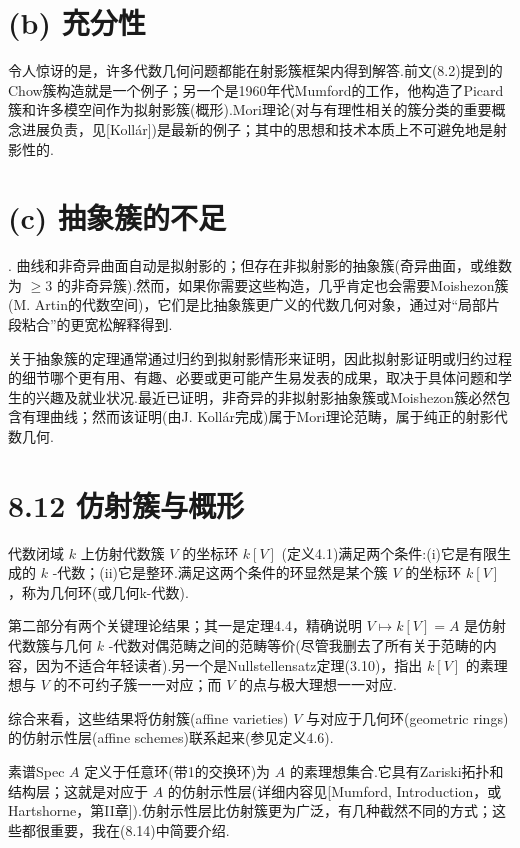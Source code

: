 \section{(b) 充分性}

令人惊讶的是，许多代数几何问题都能在射影簇框架内得到解答.前文(8.2)提到的Chow簇构造就是一个例子；另一个是1960年代Mumford的工作，他构造了Picard簇和许多模空间作为拟射影簇(概形).Mori理论(对与有理性相关的簇分类的重要概念进展负责，见[Kollár])是最新的例子；其中的思想和技术本质上不可避免地是射影性的.

\section{(c) 抽象簇的不足}
.
曲线和非奇异曲面自动是拟射影的；但存在非拟射影的抽象簇(奇异曲面，或维数为 \(\geq  3\) 的非奇异簇).然而，如果你需要这些构造，几乎肯定也会需要Moishezon簇(M. Artin的代数空间)，它们是比抽象簇更广义的代数几何对象，通过对“局部片段粘合”的更宽松解释得到.

关于抽象簇的定理通常通过归约到拟射影情形来证明，因此拟射影证明或归约过程的细节哪个更有用、有趣、必要或更可能产生易发表的成果，取决于具体问题和学生的兴趣及就业状况.最近已证明，非奇异的非拟射影抽象簇或Moishezon簇必然包含有理曲线；然而该证明(由J. Kollár完成)属于Mori理论范畴，属于纯正的射影代数几何.

\section{8.12 仿射簇与概形}

代数闭域 \(k\) 上仿射代数簇 \(V\) 的坐标环 \(k\left\lbrack  V\right\rbrack\) (定义4.1)满足两个条件:(i)它是有限生成的 \(k\) -代数；(ii)它是整环.满足这两个条件的环显然是某个簇 \(V\) 的坐标环 \(k\left\lbrack  V\right\rbrack\) ，称为几何环(或几何k-代数).

第二部分有两个关键理论结果；其一是定理4.4，精确说明 \(V \mapsto  k\left\lbrack  V\right\rbrack   = A\) 是仿射代数簇与几何 \(k\) -代数对偶范畴之间的范畴等价(尽管我删去了所有关于范畴的内容，因为不适合年轻读者).另一个是Nullstellensatz定理(3.10)，指出 \(k\left\lbrack  V\right\rbrack\) 的素理想与 \(V\) 的不可约子簇一一对应；而 \(V\) 的点与极大理想一一对应.

综合来看，这些结果将仿射簇(affine varieties) \(V\) 与对应于几何环(geometric rings)的仿射示性层(affine schemes)联系起来(参见定义4.6).

素谱Spec \(A\) 定义于任意环(带1的交换环)为 \(A\) 的素理想集合.它具有Zariski拓扑和结构层；这就是对应于 \(A\) 的仿射示性层(详细内容见[Mumford, Introduction，或Hartshorne，第II章]).仿射示性层比仿射簇更为广泛，有几种截然不同的方式；这些都很重要，我在(8.14)中简要介绍.

